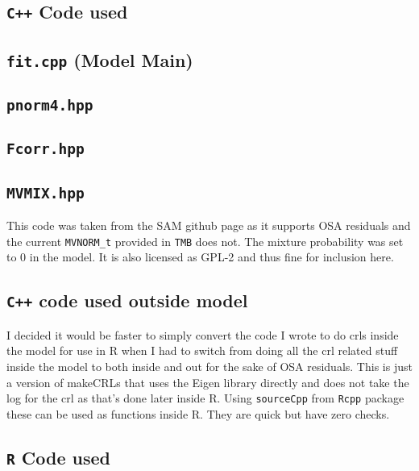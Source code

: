 \documentclass[11pt]{article}\usepackage[]{graphicx}\usepackage[]{color}
\begin{document}
\printbibliography

\begin{appendices}
  \section{\texttt{C++} Code used}\label{Ccode}
  \subsection{\texttt{fit.cpp} (Model Main)}
	
  
  \subsection{\texttt{pnorm4.hpp}}
  
  \subsection{\texttt{Fcorr.hpp}}
  
  \subsection{\texttt{MVMIX.hpp}}
  This code was taken from the SAM github page as it supports OSA residuals and the current \texttt{MVNORM\_t} provided in \texttt{TMB} does not. The mixture probability was set to 0 in the model. It is also licensed as GPL-2 and thus fine for inclusion here.
  
  \subsection{\texttt{C++} code used outside model}
  I decided it would be faster to simply convert the code I wrote to do \acrshort{crl}s inside the model for use in R when I had to switch from doing all the \acrshort{crl} related stuff inside the model to both inside and out for the sake of OSA residuals. This is just a version of makeCRLs that uses the Eigen library directly and does not take the log for the \acrshort{crl} as that's done later inside R. Using \texttt{sourceCpp} from \texttt{Rcpp} package these can be used as functions inside R. They are quick but have zero checks.
  \subsection{\texttt{R} Code used}\label{Rcode}
	
\end{appendices}
\end{document}
